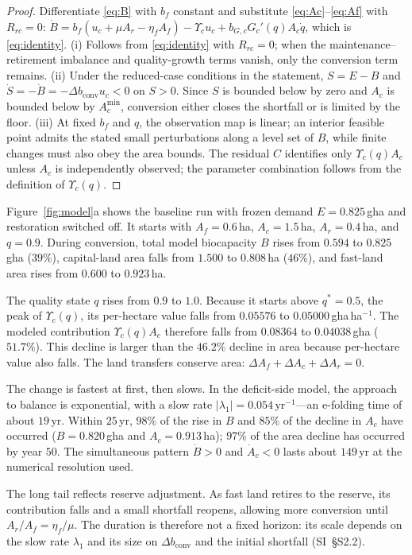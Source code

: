 \documentclass[preprint,12pt,authoryear]{elsarticle}
\newcommand{\dconv}{\Delta b_{\mathrm{conv}}}
\newcommand{\Ups}{\Upsilon_c}
\newcommand{\Acmin}{A_c^{\min}}
\begin{document}
\begin{proof}
Differentiate \eqref{eq:B} with $b_f$ constant and substitute \eqref{eq:Ac}--\eqref{eq:Af} with $R_{rc}=0$: $\dot B=b_f(u_c+\mu A_r-\eta_fA_f)-\Ups u_c+b_{G,c}G_c'(q)A_c\dot q$, which is \eqref{eq:identity}. (i) Follows from \eqref{eq:identity} with $R_{rc}=0$; when the maintenance--retirement imbalance and quality-growth terms vanish, only the conversion term remains. (ii) Under the reduced-case conditions in the statement, $S=E-B$ and $\dot S=-\dot B=-\dconv u_c<0$ on $S>0$. Since $S$ is bounded below by zero and $A_c$ is bounded below by $\Acmin$, conversion either closes the shortfall or is limited by the floor. (iii) At fixed $b_f$ and $q$, the observation map is linear; an interior feasible point admits the stated small perturbations along a level set of $B$, while finite changes must also obey the area bounds. The residual $C$ identifies only $\Ups(q)A_c$ unless $A_c$ is independently observed; the parameter combination follows from the definition of $\Ups(q)$.
\end{proof}

Figure~\ref{fig:model}a shows the baseline run with frozen demand $E=0.825$\,gha and restoration switched off. It starts with $A_f=0.6$\,ha, $A_c=1.5$\,ha, $A_r=0.4$\,ha, and $q=0.9$. During conversion, total model biocapacity $B$ rises from $0.594$ to $0.825$\,gha ($39\%$), capital-land area falls from $1.500$ to $0.808$\,ha ($46\%$), and fast-land area rises from $0.600$ to $0.923$\,ha.

The quality state $q$ rises from $0.9$ to $1.0$. Because it starts above $q^*=0.5$, the peak of $\Ups(q)$, its per-hectare value falls from $0.05576$ to $0.05000$\,gha\,ha$^{-1}$. The modeled contribution $\Ups(q)A_c$ therefore falls from $0.08364$ to $0.04038$\,gha ($51.7\%$). This decline is larger than the $46.2\%$ decline in area because per-hectare value also falls. The land transfers conserve area: $\Delta A_f+\Delta A_c+\Delta A_r=0$.

The change is fastest at first, then slows. In the deficit-side model, the approach to balance is exponential, with a slow rate $|\lambda_1|=0.054$\,yr$^{-1}$—an e-folding time of about $19$\,yr. Within $25$\,yr, $98\%$ of the rise in $B$ and $85\%$ of the decline in $A_c$ have occurred ($B=0.820$\,gha and $A_c=0.913$\,ha); $97\%$ of the area decline has occurred by year $50$. The simultaneous pattern $\dot B>0$ and $\dot A_c<0$ lasts about $149$\,yr at the numerical resolution used.

The long tail reflects reserve adjustment. As fast land retires to the reserve, its contribution falls and a small shortfall reopens, allowing more conversion until $A_r/A_f=\eta_f/\mu$. The duration is therefore not a fixed horizon: its scale depends on the slow rate $\lambda_1$ and its size on $\dconv$ and the initial shortfall (SI~\S S2.2).
\end{document}

